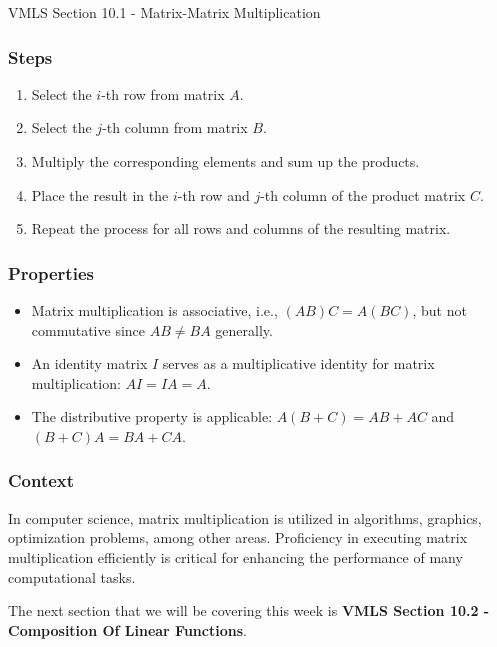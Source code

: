 \begin{notes}{VMLS Section 10.1 - Matrix-Matrix Multiplication}
\begin{highlight}
        \subsubsection*{Steps}
        \begin{enumerate}
            \item Select the $i$-th row from matrix $A$.
            \item Select the $j$-th column from matrix $B$.
            \item Multiply the corresponding elements and sum up the products.
            \item Place the result in the $i$-th row and $j$-th column of the product matrix $C$.
            \item Repeat the process for all rows and columns of the resulting matrix.
        \end{enumerate}
    \end{highlight}
    
    \subsubsection*{Properties}
    \begin{itemize}
        \item Matrix multiplication is associative, i.e., $(AB)C = A(BC)$, but not commutative since $AB \neq BA$ generally.
        \item An identity matrix $I$ serves as a multiplicative identity for matrix multiplication: $AI = IA = A$.
        \item The distributive property is applicable: $A(B + C) = AB + AC$ and $(B + C)A = BA + CA$.
    \end{itemize}
    
    \subsubsection*{Context}
    In computer science, matrix multiplication is utilized in algorithms, graphics, optimization problems, among other areas. Proficiency in executing matrix multiplication efficiently is critical for 
    enhancing the performance of many computational tasks.
\end{notes}

The next section that we will be covering this week is \textbf{VMLS Section 10.2 - Composition Of Linear Functions}.

